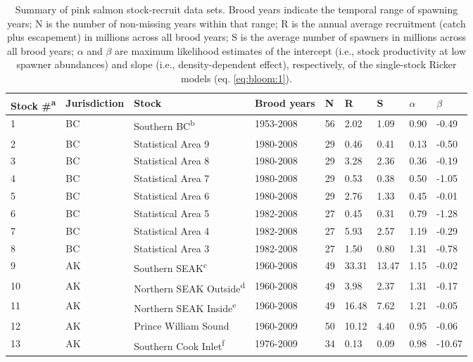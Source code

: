 {\small
\begin{longtable}{lllllllll}
\caption[Summary of pink salmon stock-recruit data sets.]{Summary of pink salmon stock-recruit data sets. Brood
years indicate the temporal range of spawning years; N is the number of
non-missing years within that range; R is the annual average recruitment
(catch plus escapement) in millions across all brood years; S is the
average number of spawners in millions across all brood years;
$\alpha$ and $\beta$ are maximum likelihood estimates of the
intercept (i.e., stock productivity at low spawner abundances) and slope
(i.e., density-dependent effect), respectively, of the single-stock
Ricker models (eq. \ref{eq:bloom:1}).} \\ 
  \hline
Stock \#\textsuperscript{a} & Jurisdiction & Stock & Brood years & N & R & S & $\alpha$ & $\beta$ \\ 
  \hline
1 & BC & Southern BC\textsuperscript{b} & 1953-2008 &  56 & 2.02 & 1.09 & 0.90 & -0.49 \\ 
  2 & BC & Statistical Area 9 & 1980-2008 &  29 & 0.46 & 0.41 & 0.13 & -0.50 \\ 
  3 & BC & Statistical Area 8 & 1980-2008 &  29 & 3.28 & 2.36 & 0.36 & -0.19 \\ 
  4 & BC & Statistical Area 7 & 1980-2008 &  29 & 0.53 & 0.38 & 0.50 & -1.05 \\ 
  5 & BC & Statistical Area 6 & 1980-2008 &  29 & 2.76 & 1.33 & 0.45 & -0.01 \\ 
  6 & BC & Statistical Area 5 & 1982-2008 &  27 & 0.45 & 0.31 & 0.79 & -1.28 \\ 
  7 & BC & Statistical Area 4 & 1982-2008 &  27 & 5.93 & 2.57 & 1.19 & -0.29 \\ 
  8 & BC & Statistical Area 3 & 1982-2008 &  27 & 1.50 & 0.80 & 1.31 & -0.78 \\ 
  9 & AK & Southern SEAK\textsuperscript{c} & 1960-2008 &  49 & 33.31 & 13.47 & 1.15 & -0.02 \\ 
  10 & AK & Northern SEAK Outside\textsuperscript{d} & 1960-2008 &  49 & 3.98 & 2.37 & 1.31 & -0.17 \\ 
  11 & AK & Northern SEAK Inside\textsuperscript{e} & 1960-2008 &  49 & 16.48 & 7.62 & 1.21 & -0.05 \\ 
  12 & AK & Prince William Sound & 1960-2009 &  50 & 10.12 & 4.40 & 0.95 & -0.06 \\ 
  13 & AK & Southern Cook Inlet\textsuperscript{f} & 1976-2009 &  34 & 0.13 & 0.09 & 0.98 & -10.67 \\ 

\end{longtable}}
